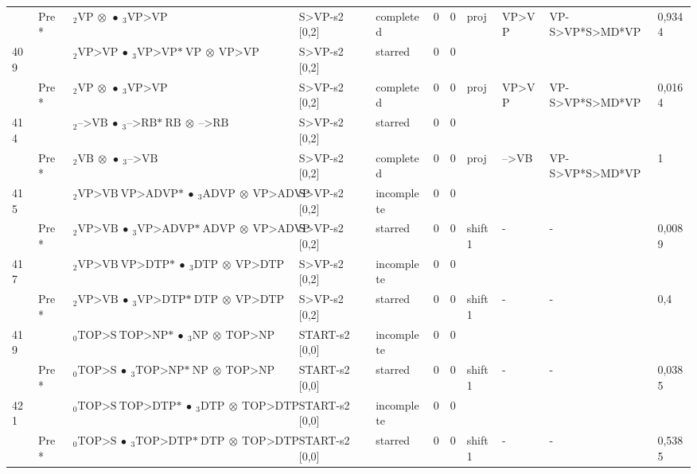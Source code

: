 \documentclass[10pt]{article}
\begin{document}
\begin{longtable}[htbp]{lllllllllll}
 & Pre *& $ {}_2 \textrm{VP} \  \otimes \  \bullet \ {}_{3} \textrm{VP>VP} $ & S>VP-s2 [0,2] & completed & 0 & 0 & proj & VP>VP & VP-S>VP*S>MD*VP & 0,9344 \\ 
409 & & $ {}_2 \textrm{VP>VP} \  \bullet \ {}_{3} \textrm{VP>VP*} \ \textrm{VP} \  \otimes \ \textrm{VP>VP} $ & S>VP-s2 [0,2] & starred & 0 & 0 & & & & \\ 
 & Pre *& $ {}_2 \textrm{VP} \  \otimes \  \bullet \ {}_{3} \textrm{VP>VP} $ & S>VP-s2 [0,2] & completed & 0 & 0 & proj & VP>VP & VP-S>VP*S>MD*VP & 0,0164 \\ 
414 & & $ {}_2 \textrm{-->VB} \  \bullet \ {}_{3} \textrm{-->RB*} \ \textrm{RB} \  \otimes \ \textrm{-->RB} $ & S>VP-s2 [0,2] & starred & 0 & 0 & & & & \\ 
 & Pre *& $ {}_2 \textrm{VB} \  \otimes \  \bullet \ {}_{3} \textrm{-->VB} $ & S>VP-s2 [0,2] & completed & 0 & 0 & proj & -->VB & VP-S>VP*S>MD*VP & 1 \\ 
415 & & $ {}_2 \textrm{VP>VB} \ \textrm{VP>ADVP*} \  \bullet \ {}_{3} \textrm{ADVP} \  \otimes \ \textrm{VP>ADVP} $ & S>VP-s2 [0,2] & incomplete & 0 & 0 & & & & \\ 
 & Pre *& $ {}_2 \textrm{VP>VB} \  \bullet \ {}_{3} \textrm{VP>ADVP*} \ \textrm{ADVP} \  \otimes \ \textrm{VP>ADVP} $ & S>VP-s2 [0,2] & starred & 0 & 0 & shift1 & - & - & 0,0089 \\ 
417 & & $ {}_2 \textrm{VP>VB} \ \textrm{VP>DTP*} \  \bullet \ {}_{3} \textrm{DTP} \  \otimes \ \textrm{VP>DTP} $ & S>VP-s2 [0,2] & incomplete & 0 & 0 & & & & \\ 
 & Pre *& $ {}_2 \textrm{VP>VB} \  \bullet \ {}_{3} \textrm{VP>DTP*} \ \textrm{DTP} \  \otimes \ \textrm{VP>DTP} $ & S>VP-s2 [0,2] & starred & 0 & 0 & shift1 & - & - & 0,4 \\ 
419 & & $ {}_0 \textrm{TOP>S} \ \textrm{TOP>NP*} \  \bullet \ {}_{3} \textrm{NP} \  \otimes \ \textrm{TOP>NP} $ & START-s2 [0,0] & incomplete & 0 & 0 & & & & \\ 
 & Pre *& $ {}_0 \textrm{TOP>S} \  \bullet \ {}_{3} \textrm{TOP>NP*} \ \textrm{NP} \  \otimes \ \textrm{TOP>NP} $ & START-s2 [0,0] & starred & 0 & 0 & shift1 & - & - & 0,0385 \\ 
421 & & $ {}_0 \textrm{TOP>S} \ \textrm{TOP>DTP*} \  \bullet \ {}_{3} \textrm{DTP} \  \otimes \ \textrm{TOP>DTP} $ & START-s2 [0,0] & incomplete & 0 & 0 & & & & \\ 
 & Pre *& $ {}_0 \textrm{TOP>S} \  \bullet \ {}_{3} \textrm{TOP>DTP*} \ \textrm{DTP} \  \otimes \ \textrm{TOP>DTP} $ & START-s2 [0,0] & starred & 0 & 0 & shift1 & - & - & 0,5385 \\ 

\end{longtable}
\end{document}
